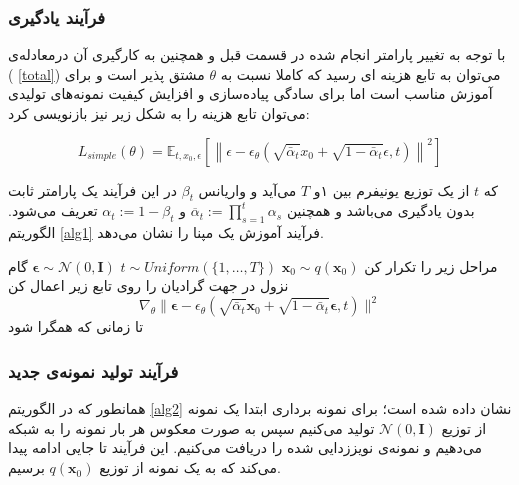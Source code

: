 \subsubsection{فرآیند یادگیری}
با توجه به تغییر پارامتر انجام شده در قسمت قبل و همچنین به کارگیری آن درمعادله‌ی ( \ref{total}) می‌توان به تابع هزینه ای رسید که کاملا نسبت به $\theta$ مشتق پذیر است و برای آموزش مناسب است اما برای سادگی پیاده‌سازی و افزایش کیفیت نمونه‌های تولیدی می‌توان تابع هزینه را به شکل زیر نیز بازنویسی کرد:

\begin{equation}
\label{loss}
L_{simple}(\theta) = \mathbb{E}_{t,x_0,\epsilon} \left[ \left \| \epsilon - \epsilon_\theta(\sqrt{\bar\alpha_t}x_0 + \sqrt{1-\bar\alpha_t}\epsilon, t) \right \|^2 \right]
\end{equation} 

که $t$ از یک توزیع یونیفرم بین ۱و $T$ می‌آید و واریانس $\beta_t$ در این فرآیند یک پارامتر ثابت بدون یادگیری می‌باشد و همچنین $ \overline{\alpha}_t := \prod_{s=1}^t \alpha_s$ و  $ \alpha_t := 1 - \beta_t$  تعریف می‌شود\cite{ho2020denoising}.  الگوریتم \ref{alg1} فرآیند آموزش یک مپنا را نشان می‌دهد.




\begin{algorithm}[H]
	\caption{آموزش\cite{ho2020denoising}}
	\begin{algorithmic}[1]
		\State مراحل زیر را تکرار کن
		\State $\mathbf{x}_0 \sim q(\mathbf{x}_0)$
		\State $t \sim \text{$Uniform$}(\{1, \ldots, T\})$
		\State $\boldsymbol{\epsilon} \sim \mathcal{N}(0, \mathbf{I})$
		\State گام نزول در جهت گرادیان را روی تابع زیر اعمال کن
		\[
		\nabla_\theta \|\boldsymbol{\epsilon} - \epsilon_\theta(\sqrt{\bar{\alpha}_t} \mathbf{x}_0 + \sqrt{1 - \bar{\alpha}_t} \boldsymbol{\epsilon}, t)\|^2
		\]
		\State تا زمانی که همگرا شود
	\end{algorithmic}
	\label{alg1}
\end{algorithm}

\subsubsection{فرآیند تولید نمونه‌ی جدید}
 همانطور که در الگوریتم \ref{alg2} نشان داده شده است؛ برای نمونه برداری ابتدا یک نمونه از توزیع  $\mathcal{N}(0, \mathbf{I})$ تولید می‌کنیم سپس به صورت معکوس هر بار نمونه را به شبکه می‌دهیم و نمونه‌ی نویززدایی شده را دریافت می‌کنیم. این فرآیند تا جایی ادامه پیدا می‌کند که به یک نمونه از توزیع $q(\mathbf{x}_0)$ برسیم.
 

